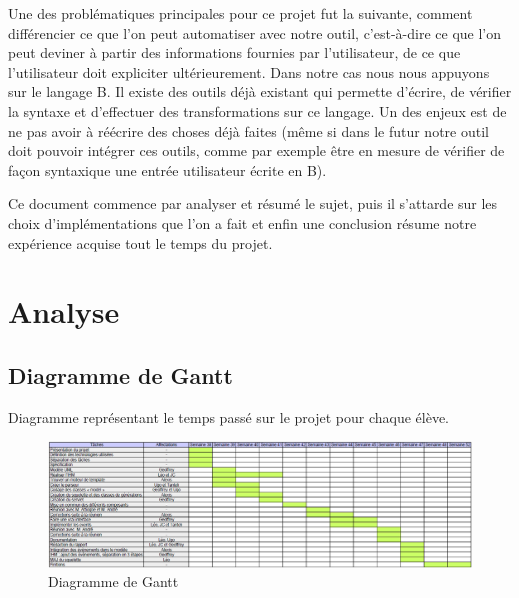 \documentclass{article}
\begin{document}
    
    \bigskip
    
    Une des problématiques principales pour ce projet fut la suivante, comment différencier ce que l'on peut automatiser avec notre outil, c'est-à-dire ce que l'on peut deviner à partir des informations fournies par l'utilisateur, de ce que l'utilisateur doit expliciter ultérieurement. Dans notre cas nous nous appuyons sur le langage B. Il existe des outils déjà existant qui permette d'écrire, de vérifier la syntaxe et d'effectuer des transformations sur ce langage. Un des enjeux est de ne pas avoir à réécrire des choses déjà faites (même si dans le futur notre outil doit pouvoir intégrer ces outils, comme par exemple être en mesure de vérifier de façon syntaxique une entrée utilisateur écrite en B).
    
    \bigskip
    
    Ce document commence par analyser et résumé le sujet, puis il s'attarde sur les choix d'implémentations que l'on a fait et enfin une conclusion résume notre expérience acquise tout le temps du projet.
    
\section{Analyse}

\subsection{Diagramme de Gantt}
    
    Diagramme représentant le temps passé sur le projet pour chaque élève.
    
    \begin{figure}[ht]
        \centering
        \includegraphics[width=\textwidth]{gantt.png}
        \caption{Diagramme de Gantt}
        \label{fig:gantt}
    \end{figure}
    
\end{document}
